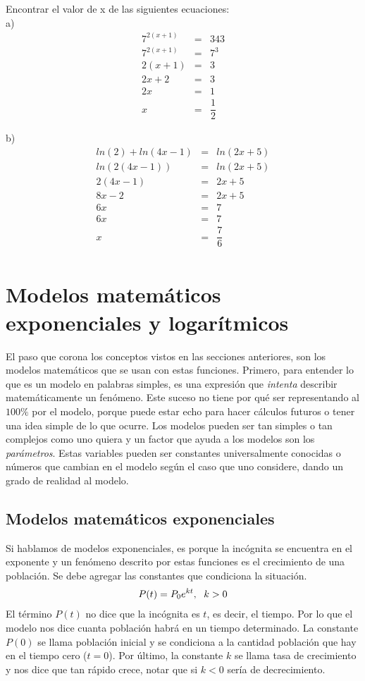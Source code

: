 \begin{myexample}
Encontrar el valor de x de las siguientes ecuaciones:\\

\noindent a)
\begin{eqnarray*}
7^{2(x+1)}&=&343\\
7^{2(x+1)}&=&7^{3}\\
2(x+1)&=&3\\
2x+2&=&3\\
2x&=&1\\
x&=&\dfrac{1}{2}
\end{eqnarray*}
\end{myexample}
\noindent b)
\begin{eqnarray*}
ln(2)+ln(4x-1)&=&ln(2x+5)\\
ln(2(4x-1))&=&ln(2x+5)\\
2(4x-1)&=&2x+5\\
8x-2&=&2x+5\\
6x&=&7\\
6x&=&7\\
x&=&\dfrac{7}{6}\\
\end{eqnarray*}

\section{Modelos matemáticos exponenciales y logarítmicos}

El paso que corona los conceptos vistos en las secciones anteriores, son los modelos matemáticos que se usan con estas funciones. Primero, para entender lo que es un modelo en palabras simples, es una expresión que \textit{intenta} describir matemáticamente un fenómeno. Este suceso no tiene por qué ser representando al $100\%$ por el modelo, porque puede estar echo para hacer cálculos futuros o tener una idea simple de lo que ocurre. Los modelos pueden ser tan simples o tan complejos como uno quiera y un factor que ayuda a los modelos son los \textit{parámetros}. Estas variables pueden ser constantes universalmente conocidas o números que cambian en el modelo según el caso que uno considere, dando un grado de realidad al modelo.

\subsection{Modelos matemáticos exponenciales}
Si hablamos de modelos exponenciales, es porque  la incógnita se encuentra en el exponente y un fenómeno descrito por estas funciones es el crecimiento de una población. Se debe agregar las constantes que condiciona la situación.
\begin{eqnarray}
P(t)=P_{0}e^{kt}, \hspace{6px} k>0 
\end{eqnarray} 
El término $P(t)$ no dice que la incógnita es $t$, es decir, el tiempo. Por lo que el modelo nos dice cuanta población habrá en un tiempo determinado. La constante $P(0)$ se llama población inicial y se condiciona a la cantidad población que hay en el tiempo cero ($t=0$). Por último, la constante $k$ se llama tasa de crecimiento y nos dice que tan rápido crece, notar que si $k<0$ sería de decrecimiento. 

